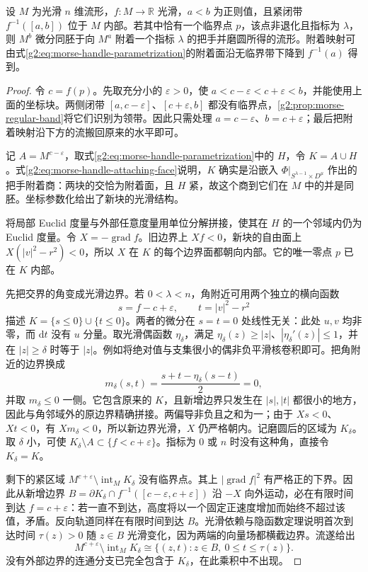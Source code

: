 \begin{theorem}\label{g2:thm:morse-handle-attachment}
	设 \(M\) 为光滑 \(n\) 维流形，\(f:M\to\mathbb R\) 光滑，\(a<b\) 为正则值，且紧闭带 \(f^{-1}([a,b])\) 位于 \(M\) 内部。若其中恰有一个临界点 \(p\)，该点非退化且指标为 \(\lambda\)，则 \(M^b\) 微分同胚于向 \(M^a\) 附着一个指标 \(\lambda\) 的把手并磨圆所得的流形。附着映射可由式\eqref{g2:eq:morse-handle-parametrization}的附着面沿无临界带下降到 \(f^{-1}(a)\) 得到。
\end{theorem}
\begin{proof}
	令 \(c=f(p)\)。先取充分小的 \(\varepsilon>0\)，使 \(a<c-\varepsilon<c+\varepsilon<b\)，并能使用上面的坐标块。两侧闭带 \([a,c-\varepsilon]\)、\([c+\varepsilon,b]\) 都没有临界点，\cref{g2:prop:morse-regular-band}将它们识别为领带。因此只需处理 \(a=c-\varepsilon\)、\(b=c+\varepsilon\)；最后把附着映射沿下方的流搬回原来的水平即可。

	记 \(A=M^{c-\varepsilon}\)，取式\eqref{g2:eq:morse-handle-parametrization}中的 \(H\)，令 \(K=A\cup H\)。式\eqref{g2:eq:morse-handle-attaching-face}说明，\(K\) 确实是沿嵌入 \(\Phi|_{S^{\lambda-1}\times D^\mu}\) 作出的把手附着商：两块的交恰为附着面，且 \(H\) 紧，故这个商到它们在 \(M\) 中的并是同胚。坐标参数化给出了新块的光滑结构。

	将局部 Euclid 度量与外部任意度量用单位分解拼接，使其在 \(H\) 的一个邻域内仍为 Euclid 度量。令 \(X=-\operatorname{grad}f\)。旧边界上 \(Xf<0\)，新块的自由面上 \(X(|v|^2-r^2)<0\)，所以 \(X\) 在 \(K\) 的每个边界面都朝向内部。它的唯一零点 \(p\) 已在 \(K\) 内部。

	先把交界的角变成光滑边界。若 \(0<\lambda<n\)，角附近可用两个独立的横向函数
	\[
		s=f-c+\varepsilon,\qquad t=|v|^2-r^2
	\]
	描述 \(K=\{s\le0\}\cup\{t\le0\}\)。两者的微分在 \(s=t=0\) 处线性无关：此处 \(u,v\) 均非零，而 \(\mathrm{d}t\) 没有 \(u\) 分量。取光滑偶函数 \(\eta_\delta\)，满足 \(\eta_\delta(z)\ge|z|\)、\(|\eta_\delta'(z)|\le1\)，并在 \(|z|\ge\delta\) 时等于 \(|z|\)。例如将绝对值与支集很小的偶非负平滑核卷积即可。把角附近的边界换成
	\[
		m_\delta(s,t)=\frac{s+t-\eta_\delta(s-t)}2=0,
	\]
	并取 \(m_\delta\le0\) 一侧。它包含原来的 \(K\)，且新增边界只发生在 \(|s|,|t|\) 都很小的地方，因此与角邻域外的原边界精确拼接。两偏导非负且之和为一；由于 \(Xs<0\)、\(Xt<0\)，有 \(Xm_\delta<0\)，所以新边界光滑，\(X\) 仍严格朝内。记磨圆后的区域为 \(K_\delta\)。取 \(\delta\) 小，可使 \(K_\delta\setminus A\subset\{f<c+\varepsilon\}\)。指标为 \(0\) 或 \(n\) 时没有这种角，直接令 \(K_\delta=K\)。

	剩下的紧区域 \(M^{c+\varepsilon}\setminus\operatorname{int}_M K_\delta\) 没有临界点。其上 \(|\operatorname{grad}f|^2\) 有严格正的下界。因此从新增边界 \(B=\partial K_\delta\cap f^{-1}([c-\varepsilon,c+\varepsilon])\) 沿 \(-X\) 向外运动，必在有限时间到达 \(f=c+\varepsilon\)：若一直不到达，高度将以一个固定正速度增加而始终不超过该值，矛盾。反向轨道同样在有限时间到达 \(B\)。光滑依赖与隐函数定理说明首次到达时间 \(\tau(z)>0\) 随 \(z\in B\) 光滑变化，因为两端的向量场都横截边界。流遂给出
	\[
		M^{c+\varepsilon}\setminus\operatorname{int}_M K_\delta
		\cong\{(z,t):z\in B,\ 0\le t\le\tau(z)\}.
	\]
	没有外部边界的连通分支已完全包含于 \(K_\delta\)，在此乘积中不出现。


\end{proof}
